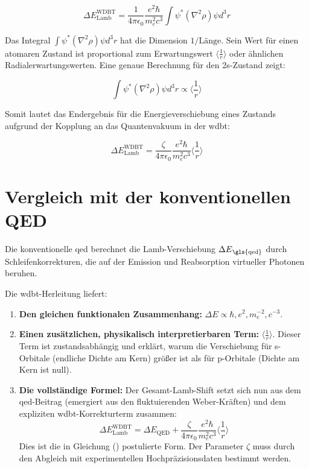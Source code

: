 \begin{equation}
    \Delta E_{\text{Lamb}}^{\text{WDBT}} = \frac{1}{4\pi\epsilon_0} \frac{e^2 \hbar}{m_e^2 c^3} \int \psi^* (\nabla^2 \rho) \psi  d^3r
\end{equation}

Das Integral $\int \psi^* (\nabla^2 \rho) \psi  d^3r$ hat die Dimension $1/\text{Länge}$. Sein Wert für einen atomaren Zustand ist proportional zum Erwartungswert $\langle \frac{1}{r} \rangle$ oder ähnlichen Radialerwartungswerten. Eine genaue Berechnung für den 2s-Zustand zeigt:

\begin{equation}
    \int \psi^* (\nabla^2 \rho) \psi  d^3r \propto \langle \frac{1}{r} \rangle
\end{equation}

Somit lautet das Endergebnis für die Energieverschiebung eines Zustands aufgrund der Kopplung an das Quantenvakuum in der \gls{wdbt}:

\begin{equation}
    \boxed
    {
        \Delta E_{\text{Lamb}}^{\text{WDBT}} = \frac{\zeta}{4\pi\epsilon_0} \frac{e^2 \hbar}{m_e^2 c^3} \langle \frac{1}{r} \rangle
    }
\end{equation}

\section{Vergleich mit der konventionellen QED}
Die konventionelle \gls{qed} berechnet die Lamb-Verschiebung ${\Delta E}_\text{\gls{qed}}$ durch Schleifenkorrekturen, die auf der Emission und Reabsorption virtueller Photonen beruhen.

Die \gls{wdbt}-Herleitung liefert:

\begin{enumerate}
    \item \textbf{Den gleichen funktionalen Zusammenhang:} $\Delta E \propto \hbar, e^2, m_e^{-2}, c^{-3}$.
    \item \textbf{Einen zusätzlichen, physikalisch interpretierbaren Term:} $\langle \frac{1}{r} \rangle$. Dieser Term ist zustandsabhängig und erklärt, warum die Verschiebung für s-Orbitale (endliche Dichte am Kern) größer ist als für p-Orbitale (Dichte am Kern ist null).
    \item \textbf{Die vollständige Formel:} Der Gesamt-Lamb-Shift setzt sich nun aus dem \gls{qed}-Beitrag (emergiert aus den fluktuierenden Weber-Kräften) und dem expliziten \gls{wdbt}-Korrekturterm zusammen:
    \begin{equation}
        \Delta E_{\text{Lamb}}^{\text{WDBT}} = \Delta E_{\text{QED}} + \frac{\zeta}{4\pi\epsilon_0} \frac{e^2 \hbar}{m_e^2 c^3} \langle \frac{1}{r} \rangle
    \end{equation}
    Dies ist die in Gleichung () postulierte Form. Der Parameter $\zeta$ muss durch den Abgleich mit experimentellen Hochpräzisionsdaten bestimmt werden.
\end{enumerate}

